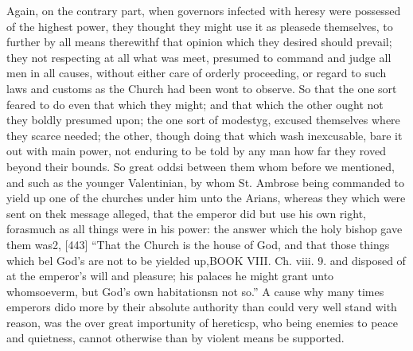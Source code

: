 Again, on the contrary part, when governors infected with heresy were possessed of the highest power, they thought they might use it as pleasede themselves, to further by all means therewithf that opinion which they desired should prevail; they not respecting at all what was meet, presumed to command and judge all men in all causes, without either care of orderly proceeding, or regard to such laws and customs as the Church had been wont to observe. So that the one sort feared to do even that which they might; and that which the other ought not they boldly presumed upon; the one sort of modestyg, excused themselves where they scarce needed; the other, though doing that which wash inexcusable, bare it out with main power, not enduring to be told by any man how far they roved beyond their bounds. So great oddsi between them whom before we mentioned, and such as the younger Valentinian, by whom St. Ambrose being commanded to yield up one of the churches under him unto the Arians, whereas they which were sent on thek message alleged, that the emperor did but use his own right, forasmuch as all things were in his power: the answer which the holy bishop gave them was2, [443] “That the Church is the house of God, and that those things which bel God’s are not to be yielded up,BOOK VIII. Ch. viii. 9. and disposed of at the emperor’s will and pleasure; his palaces he might grant unto whomsoeverm, but God’s own habitationsn not so.” A cause why many times emperors dido more by their absolute authority than could very well stand with reason, was the over great importunity of hereticsp, who being enemies to peace and quietness, cannot otherwise than by violent means be supported.

